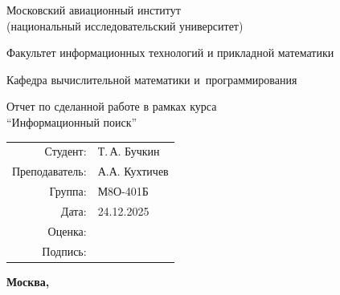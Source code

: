 \begin{titlepage}
\begin{center}
\bfseries

{\Large Московский авиационный институт\\ (национальный исследовательский университет)

}

\vspace{48pt}

{\large Факультет информационных технологий и прикладной математики
}

\vspace{36pt}

{\large Кафедра вычислительной математики и~программирования

}


\vspace{48pt}

Отчет по сделанной работе в рамках курса\\\enquote{Информационный поиск}

\end{center}

\vspace{72pt}

\begin{flushright}
\begin{tabular}{rl}
Студент: & Т.\,А. Бучкин \\
Преподаватель: & А.А. Кухтичев \\
Группа: & М8О-401Б \\
Дата: &24.12.2025 \\
Оценка: & \\
Подпись: & \\
\end{tabular}
\end{flushright}

\vfill

\begin{center}
\bfseries
Москва, \the\year
\end{center}
\end{titlepage}

\pagebreak
